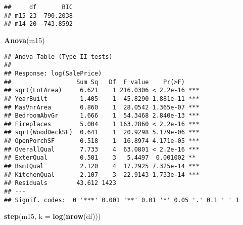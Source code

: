 \documentclass[
]{article}
\newenvironment{Shaded}{\begin{snugshade}}{\end{snugshade}}
\newcommand{\AttributeTok}[1]{\textcolor[rgb]{0.13,0.29,0.53}{#1}}
\newcommand{\FunctionTok}[1]{\textcolor[rgb]{0.13,0.29,0.53}{\textbf{#1}}}
\newcommand{\NormalTok}[1]{#1}
\begin{document}
\begin{verbatim}
##     df       BIC
## m15 23 -790.2038
## m14 20 -743.8592
\end{verbatim}

\begin{Shaded}
\begin{Highlighting}[]
\FunctionTok{Anova}\NormalTok{(m15)}
\end{Highlighting}
\end{Shaded}

\begin{verbatim}
## Anova Table (Type II tests)
## 
## Response: log(SalePrice)
##                  Sum Sq   Df  F value    Pr(>F)    
## sqrt(LotArea)     6.621    1 216.0306 < 2.2e-16 ***
## YearBuilt         1.405    1  45.8290 1.881e-11 ***
## MasVnrArea        0.860    1  28.0542 1.365e-07 ***
## BedroomAbvGr      1.666    1  54.3468 2.840e-13 ***
## Fireplaces        5.004    1 163.2860 < 2.2e-16 ***
## sqrt(WoodDeckSF)  0.641    1  20.9298 5.179e-06 ***
## OpenPorchSF       0.518    1  16.8974 4.171e-05 ***
## OverallQual       7.733    4  63.0801 < 2.2e-16 ***
## ExterQual         0.501    3   5.4497  0.001002 ** 
## BsmtQual          2.120    4  17.2925 7.325e-14 ***
## KitchenQual       2.107    3  22.9143 1.733e-14 ***
## Residuals        43.612 1423                       
## ---
## Signif. codes:  0 '***' 0.001 '**' 0.01 '*' 0.05 '.' 0.1 ' ' 1
\end{verbatim}

\begin{Shaded}
\begin{Highlighting}[]
\FunctionTok{step}\NormalTok{(m15, }\AttributeTok{k =} \FunctionTok{log}\NormalTok{(}\FunctionTok{nrow}\NormalTok{(df)))}
\end{Highlighting}
\end{Shaded}
\end{document}
